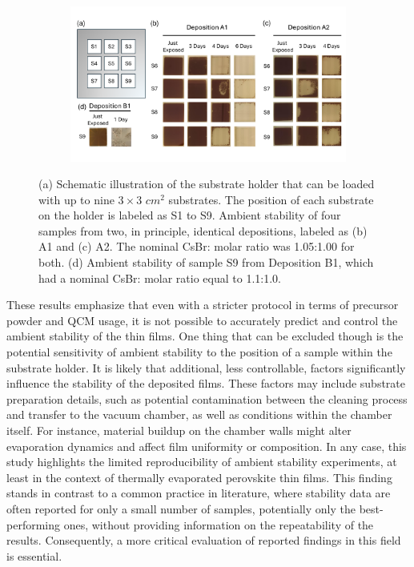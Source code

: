 \begin{figure}[htbp]
    \centering
    \begin{subfigure}[t]{0.99\textwidth}
        \centering
        \includegraphics[width=\textwidth]{chapters/stability/imeges/Stability - Rotation.pdf} %
    \end{subfigure}
    \caption{(a) Schematic illustration of the substrate holder that can be loaded with up to nine $3\times 3$ $cm^2$ substrates. The position of each substrate on the holder is labeled as S1 to S9. Ambient stability of four samples from two, in principle, identical depositions, labeled as (b) A1 and (c) A2. The nominal CsBr: molar ratio was 1.05:1.00 for both. (d) Ambient stability of sample S9 from Deposition B1, which had a nominal CsBr: molar ratio equal to 1.1:1.0.}
    \label{fig:stability:repeatability}
\end{figure}

These results emphasize that even with a stricter protocol in terms of precursor powder and QCM usage, it is not possible to accurately predict and control the ambient stability of the  thin films. One thing that can be excluded though is the potential sensitivity of ambient stability to the position of a sample within the substrate holder. It is likely that additional, less controllable, factors significantly influence the stability of the deposited films. These factors may include substrate preparation details, such as potential contamination between the cleaning process and transfer to the vacuum chamber, as well as conditions within the chamber itself. For instance, material buildup on the chamber walls might alter evaporation dynamics and affect film uniformity or composition. In any case, this study highlights the limited reproducibility of ambient stability experiments, at least in the context of thermally evaporated perovskite thin films. This finding stands in contrast to a common practice in literature, where stability data are often reported for only a small number of samples, potentially only the best-performing ones, without providing information on the repeatability of the results. Consequently, a more critical evaluation of reported findings in this field is essential.

